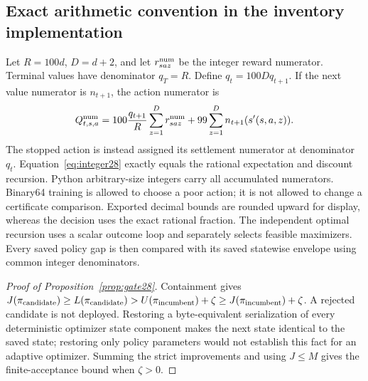 \subsection{Exact arithmetic convention in the inventory implementation}
Let $R=100d$, $D=d+2$, and let $r_{saz}^{\rm num}$ be the integer reward numerator. Terminal values have denominator $q_T=R$. Define $q_t=100Dq_{t+1}$. If the next value numerator is $n_{t+1}$, the action numerator is
\begin{equation}\label{eq:integer28}
 Q_{t,s,a}^{\rm num}=100\frac{q_{t+1}}R\sum_{z=1}^{D}r_{saz}^{\rm num}
 +99\sum_{z=1}^{D}n_{t+1}(s'(s,a,z)).
\end{equation}
The stopped action is instead assigned its settlement numerator at denominator $q_t$. Equation~\eqref{eq:integer28} exactly equals the rational expectation and discount recursion. Python arbitrary-size integers carry all accumulated numerators. Binary64 training is allowed to choose a poor action; it is not allowed to change a certificate comparison. Exported decimal bounds are rounded upward for display, whereas the decision uses the exact rational fraction. The independent optimal recursion uses a scalar outcome loop and separately selects feasible maximizers. Every saved policy gap is then compared with its saved statewise envelope using common integer denominators.

\begin{proof}[Proof of Proposition~\ref{prop:gate28}]
Containment gives $J(\pi_{\rm candidate})\ge L(\pi_{\rm candidate})>U(\pi_{\rm incumbent})+\zeta\ge J(\pi_{\rm incumbent})+\zeta$. A rejected candidate is not deployed. Restoring a byte-equivalent serialization of every deterministic optimizer state component makes the next state identical to the saved state; restoring only policy parameters would not establish this fact for an adaptive optimizer. Summing the strict improvements and using $J\le M$ gives the finite-acceptance bound when $\zeta>0$.
\end{proof}

